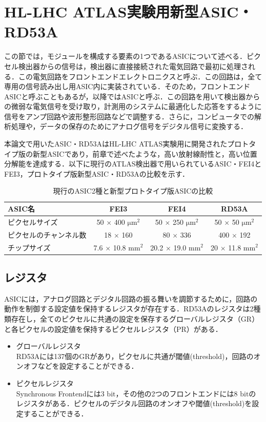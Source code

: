 \section{HL-LHC ATLAS実験用新型ASIC・RD53A}
\label{sec:rd53a}
この節では，モジュールを構成する要素の1つであるASICについて述べる．ピクセル検出器からの信号は，検出器に直接接続された電気回路で最初に処理される．この電気回路をフロントエンドエレクトロニクスと呼ぶ．この回路は，全て専用の信号読み出し用ASIC内に実装されている．そのため，フロントエンドASICと呼ぶこともあるが，以降ではASICと呼ぶ．この回路を用いて検出器からの微弱な電気信号を受け取り，計測用のシステムに最適化した応答をするように信号をアンプ回路や波形整形回路などで調整する．さらに，コンピュータでの解析処理や，データの保存のためにアナログ信号をデジタル信号に変換する．\par
本論文で用いたASIC・RD53AはHL-LHC ATLAS実験用に開発されたプロトタイプ版の新型ASICであり，前章で述べたような，高い放射線耐性と，高い位置分解能を達成する．以下に現行のATLAS検出器で用いられているASIC・FEI4とFEI3，プロトタイプ版新型ASIC・RD53Aの比較を示す．

\begin{table}[h]
  \centering
  \caption{現行のASIC2種と新型プロトタイプ版ASICの比較}
  \begin{tabular} {|l|cc|c|} \hline
    ASIC名 & FEI3 & FEI4 & RD53A \\ \hline \hline
    ピクセルサイズ & 50 $\times$ 400 $\mathrm{\mu m^2}$ & 50 $\times$ 250 $\mathrm{\mu m^2}$ & 50 $\times$ 50 $\mathrm{\mu m^2}$ \\
    ピクセルのチャンネル数 & 18 $\times$ 160 & 80 $\times$ 336 & 400 $\times$ 192  \\ 
    チップサイズ & 7.6 $\times$ 10.8 $\mathrm{mm^2}$ & 20.2 $\times$ 19.0 $\mathrm{mm^2}$ & 20 $\times$ 11.8 $\mathrm{mm^2}$\\ \hline
  \end{tabular}
  \label{tab:ASIC}
\end{table}


\subsection{レジスタ}
ASICには，アナログ回路とデジタル回路の振る舞いを調節するために，回路の動作を制御する設定値を保持するレジスタが存在する．RD53Aのレジスタは2種類存在し，全てのピクセルに共通の設定を保存するグローバルレジスタ（GR）と各ピクセルの設定値を保持するピクセルレジスタ（PR）がある．
\begin{itemize}
\item グローバルレジスタ\\
  RD53Aには137個のGRがあり，ピクセルに共通が閾値(threshold)，回路のオンオフなどを設定することができる．
\item ピクセルレジスタ\\
  Synchronous Frontendには3 $\mathrm{bit}$，その他の2つのフロントエンドには8 $\mathrm{bit}$のレジスタがある．ピクセルのデジタル回路のオンオフや閾値(threshold)を設定することができる．
\end{itemize}


